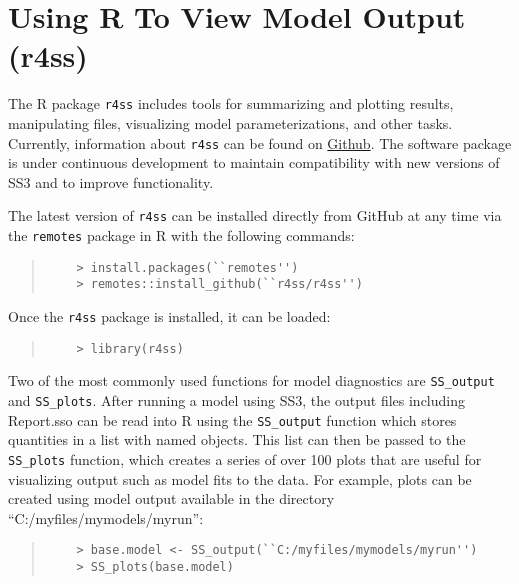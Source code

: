 
\section{Using R To View Model Output (r4ss)} \label{sec:r4ss}

The R package \texttt{r4ss} includes tools for summarizing and plotting results, manipulating files, visualizing model parameterizations, and other tasks. Currently, information about \texttt{r4ss} can be found on \href{https://github.com/r4ss/r4ss}{Github}.  The software package is under continuous development to maintain compatibility with new versions of SS3 and to improve functionality.

The latest version of \texttt{r4ss} can be installed directly from GitHub at any time via the \texttt{remotes} package in R with the following commands:

\begin{quote}
	\begin{verbatim}
	> install.packages(``remotes'')
	> remotes::install_github(``r4ss/r4ss'')
	\end{verbatim}
\end{quote}

Once the \texttt{r4ss} package is installed, it can be loaded:

\begin{quote}
	\begin{verbatim}
	> library(r4ss)
	\end{verbatim}
\end{quote}

Two of the most commonly used functions for model diagnostics are \texttt{SS\_output} and \texttt{SS\_plots}. After running a model using SS3, the output files including Report.sso can be read into R using the \texttt{SS\_output} function which stores quantities in a list with named objects.  This list can then be passed to the \texttt{SS\_plots} function, which creates a series of over 100 plots that are useful for visualizing output such as model fits to the data. For example, plots can be created using model output available in the directory ``C:/myfiles/mymodels/myrun'':

\begin{quote}
	\begin{verbatim}
	> base.model <- SS_output(``C:/myfiles/mymodels/myrun'')
	> SS_plots(base.model)
	\end{verbatim}
\end{quote}
  
